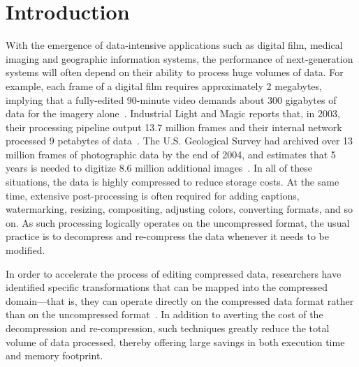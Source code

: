 \section{Introduction}

With the emergence of data-intensive applications such as digital
film, medical imaging and geographic information systems, the
performance of next-generation systems will often depend on their
ability to process huge volumes of data.  For example, each frame of a
digital film requires approximately 2 megabytes, implying that a
fully-edited 90-minute video demands about 300 gigabytes of data for
the imagery alone~\cite{ibm-video}.  Industrial Light and Magic
reports that, in 2003, their processing pipeline output 13.7 million
frames and their internal network processed 9 petabytes of
data~\cite{ilm-interview}.  The U.S. Geological Survey had archived
over 13 million frames of photographic data by the end of 2004, and
estimates that 5 years is needed to digitize 8.6 million additional
images~\cite{usgs}.  In all of these situations, the data is highly
compressed to reduce storage costs.  At the same time, extensive
post-processing is often required for adding captions, watermarking,
resizing, compositing, adjusting colors, converting formats, and so
on.  As such processing logically operates on the uncompressed format,
the usual practice is to decompress and re-compress the data whenever
it needs to be modified.


In order to accelerate the process of editing compressed data,
researchers have identified specific transformations that can be
mapped into the compressed domain---that is, they can operate directly
on the compressed data format rather than on the uncompressed
format~\cite{chang95survey,mandal95survey,smith95survey,wee02survey}.
In addition to averting the cost of the decompression and
re-compression, such techniques greatly reduce the total volume of
data processed, thereby offering large savings in both execution time
and memory footprint.

